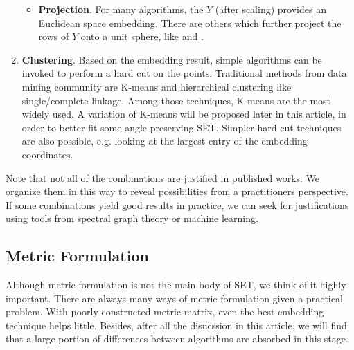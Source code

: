 \begin{enumerate}
\begin{itemize}
				\item \textbf{Projection}. For many algorithms, the $Y$ 
					(after scaling) provides an Euclidean space embedding. 
					There are others which further project the rows of $Y$
					onto a unit sphere, like \cite{ng2002spectral} and
					\cite{brand2003unifying}. 
			\end{itemize}
	\item \textbf{Clustering}. 
		Based on the embedding result, simple algorithms can be invoked to 
		perform a hard cut on the points. Traditional methods from data mining
		community are K-means and hierarchical clustering like single/complete
		linkage\cite{jiawei2001data}. Among those techniques, K-means are the most 
		widely used. A variation of K-means will be proposed later in this article,
		in order to better fit some angle preserving SET. Simpler 
		hard cut techniques are also possible, e.g. looking at the largest entry 
		of the embedding coordinates\cite{kannan2004clusterings}.  
\end{enumerate}

Note that not all of the combinations are justified in published works. 
We organize them in this way to reveal possibilities from a practitioners
perspective. If some combinations yield good results in practice, we can 
seek for justifications using tools from spectral graph theory or machine learning. 


\subsection{Metric Formulation}
\label{sec:metric}

Although metric formulation is not the main body of SET, 
we think of it highly important.  
There are always many ways of metric formulation
given a practical problem. With poorly constructed 
metric matrix, even the best embedding technique helps little.  
Besides, after all the disucssion in this article, 
we will find that a large portion of 
differences between algorithms 
are absorbed in this stage. 


